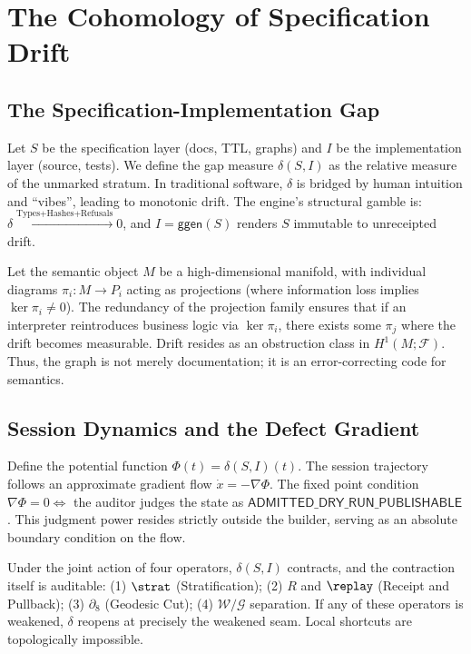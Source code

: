 \chapter{The Cohomology of Specification Drift}

\section{The Specification-Implementation Gap}

\begin{defn}
Let $S$ be the specification layer (docs, TTL, graphs) and $I$ be the implementation layer (source, tests). We define the gap measure $\delta(S, I)$ as the relative measure of the unmarked stratum. In traditional software, $\delta$ is bridged by human intuition and ``vibes'', leading to monotonic drift. The engine's structural gamble is: $\delta \xrightarrow{\text{Types+Hashes+Refusals}} 0$, and $I = \mathsf{ggen}(S)$ renders $S$ immutable to unreceipted drift.
\end{defn}

\begin{thm}
Let the semantic object $M$ be a high-dimensional manifold, with individual diagrams $\pi_i : M \to P_i$ acting as projections (where information loss implies $\ker \pi_i \ne 0$). The redundancy of the projection family ensures that if an interpreter reintroduces business logic via $\ker \pi_i$, there exists some $\pi_j$ where the drift becomes measurable. Drift resides as an obstruction class in $H^1(M; \mathcal{F})$. Thus, the graph is not merely documentation; it is an error-correcting code for semantics.
\end{thm}

\section{Session Dynamics and the Defect Gradient}

\begin{obs}
Define the potential function $\Phi(t) = \delta(S, I)(t)$. The session trajectory follows an approximate gradient flow $\dot{x} = -\nabla \Phi$. The fixed point condition $\nabla \Phi = 0 \iff$ the auditor judges the state as $\mathsf{ADMITTED\_DRY\_RUN\_PUBLISHABLE}$. This judgment power resides strictly outside the builder, serving as an absolute boundary condition on the flow.
\end{obs}

\begin{thm}
Under the joint action of four operators, $\delta(S,I)$ contracts, and the contraction itself is auditable:
(1) $\strat$ (Stratification);
(2) $R$ and $\replay$ (Receipt and Pullback);
(3) $\partial_8$ (Geodesic Cut);
(4) $\mathcal{W}/\mathcal{G}$ separation.
If any of these operators is weakened, $\delta$ reopens at precisely the weakened seam. Local shortcuts are topologically impossible.
\end{thm}
